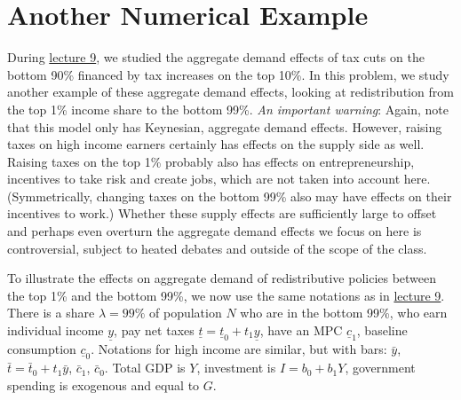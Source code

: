 \documentclass[]{book}
\theoremstyle{definition}
\theoremstyle{definition}
\theoremstyle{definition}
\theoremstyle{remark}
\begin{document}
\section*{Another Numerical Example}\label{another-numerical-example}

During \protect\hyperlink{redistributive}{lecture 9}, we studied the
aggregate demand effects of tax cuts on the bottom 90\% financed by tax
increases on the top 10\%. In this problem, we study another example of
these aggregate demand effects, looking at redistribution from the top
1\% income share to the bottom 99\%. \emph{An important warning}: Again,
note that this model only has Keynesian, aggregate demand effects.
However, raising taxes on high income earners certainly has effects on
the supply side as well. Raising taxes on the top 1\% probably also has
effects on entrepreneurship, incentives to take risk and create jobs,
which are not taken into account here. (Symmetrically, changing taxes on
the bottom 99\% also may have effects on their incentives to work.)
Whether these supply effects are sufficiently large to offset and
perhaps even overturn the aggregate demand effects we focus on here is
controversial, subject to heated debates and outside of the scope of the
class.

To illustrate the effects on aggregate demand of redistributive policies
between the top 1\% and the bottom 99\%, we now use the same notations
as in \protect\hyperlink{redistributive}{lecture 9}. There is a share
\(\lambda = 99\%\) of population \(N\) who are in the bottom 99\%, who
earn individual income \(\underline{y}\), pay net taxes
\(\underline{t}=\underline{t}_0 + t_1 \underline{y}\), have an MPC
\(\underline{c}_1\), baseline consumption \(\underline{c}_0\). Notations
for high income are similar, but with bars: \(\bar{y}\),
\(\bar{t}=\bar{t}_0+t_1 \bar{y}\), \(\bar{c}_1\), \(\bar{c}_0\). Total
GDP is \(Y\), investment is \(I=b_0 +b_1 Y\), government spending is
exogenous and equal to \(G\).
\end{document}
